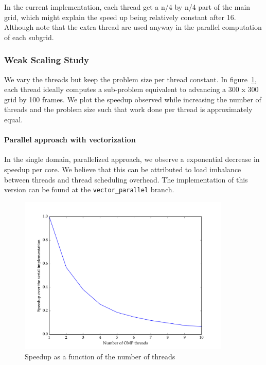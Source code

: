 \documentclass[11pt]{article}
\begin{document}
In the current implementation, each thread get a n/4 by n/4 part of the main grid, which might explain the speed up being relatively constant after 16. Although note that the extra thread are used anyway in the parallel computation of each subgrid.



\subsubsection{Weak Scaling Study}

We vary the threads but keep the problem size per thread constant. In figure~\ref{fig:weak_scaling}, each thread ideally computes a sub-problem equivalent to advancing a 300 x 300 grid by 100 frames. We 
plot the speedup observed while increasing the number of threads and the problem size such that work done per thread is approximately equal. 

\paragraph{Parallel approach with vectorization}

In the single domain, parallelized approach, we observe a exponential decrease in speedup per core. We believe that this can be attributed to load imbalance between threads and thread scheduling overhead. The implementation of this version can be found at the \texttt{vector\_parallel} branch.
 

 \begin{figure}[H]
    \includegraphics[width=0.9\textwidth]{./weak_scaling/weak_scaling_vector_parallel.png}
    \caption{Speedup as a function of the number of threads}
    \label{fig:weak_scaling}
\end{figure} 
\end{document}
